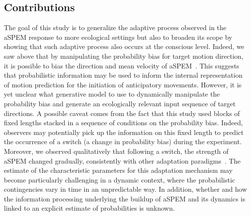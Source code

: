 \documentclass[12pt,english]{article}%
\newcommand{\citep}[1]{\parencite{#1}}
\newcommand{\seeSec}[1]{Section~\ref{sec:#1}}
\begin{document}
\subsection{Contributions}%
The goal of this study is to generalize the adaptive process
observed in the aSPEM response to more ecological settings but
also to broaden its scope by showing that such adaptive process
also occurs at the conscious level.
Indeed, we saw above that by manipulating the probability bias for target motion direction,
it is possible to bias the direction and mean velocity of aSPEM~\citep{Montagnini2010}.
This suggests that probabilistic information may be used
to inform the internal representation of motion prediction
for the initiation of anticipatory movements.
However, it is yet unclear what generative model to use
to dynamically manipulate the probability bias
and generate an ecologically relevant input sequence of target directions.
A possible caveat comes from the fact that 
this study used blocks of fixed lengths 
stacked in a sequence of conditions on the probability bias.
Indeed, observers may potentially pick up
the information on this fixed length
to predict the occurrence of a switch (a change in probability bias) during the experiment.
Moreover, we observed qualitatively that following a switch,
the strength of aSPEM changed gradually,
consistently with other adaptation paradigms~\citep{Fukushima1996,Kahlon1996,Souto13}.
The estimate of the characteristic parameters for this  adaptation mechanism 
may become particularly challenging in a dynamic context,
where the probabilistic contingencies vary in time in an unpredictable way.
In addition, whether and how the information processing underlying
the buildup of aSPEM and its dynamics is linked to
an explicit estimate of probabilities is unknown.
\end{document}

